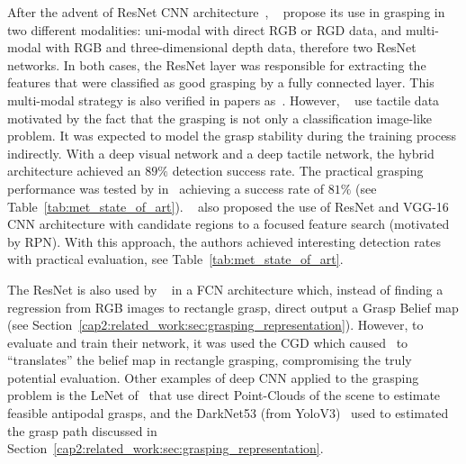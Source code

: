 After the advent of ResNet \ac{CNN} architecture~\cite{he2016deep}, \citeauthor{Kumra2017}~\cite{Kumra2017} propose its use in grasping in two different modalities: uni-modal with direct RGB or RGD data, and multi-modal with RGB and three-dimensional depth data, therefore two ResNet networks. In both cases, the ResNet layer was responsible for extracting the features that were classified as good grasping by a fully connected layer. This multi-modal strategy is also verified in papers as~\cite{Guo2017}. However, \citeauthor{Guo2017}~\cite{Guo2017} use tactile data motivated by the fact that the grasping is not only a classification image-like problem.  It was expected to model the grasp stability during the training process indirectly. With a deep visual network and a deep tactile network, the hybrid architecture achieved an $89\%$ detection success rate. The practical grasping performance was tested by \citeauthor{Chu2018} in~\cite{Chu2018} achieving a success rate of $81\%$ (see Table~\ref{tab:met_state_of_art}). \citeauthor{Chu2018}~\cite{Chu2018} also proposed the use of  ResNet and VGG-16 \ac{CNN} architecture with candidate regions to a focused feature search (motivated by \ac{RPN}). With this approach, the authors achieved interesting detection rates with practical evaluation, see Table~\ref{tab:met_state_of_art}. 

The ResNet is also used by \citeauthor{Ghazaei2019}~\cite{Ghazaei2019} in a \ac{FCN} architecture which, instead of finding a regression from RGB images to rectangle grasp, direct output a Grasp Belief map (see Section~\ref{cap2:related_work:sec:grasping_representation}). However, to evaluate and train their network, it was used the \ac{CGD} which caused~\cite{Ghazaei2019} to ``translates'' the belief map in rectangle grasping, compromising the truly potential evaluation. Other examples of deep \ac{CNN} applied to the grasping problem is the LeNet of~\cite{TenPas2017} that use direct Point-Clouds of the scene to estimate feasible antipodal grasps, and the DarkNet53 (from YoloV3)~\cite{Chen2020} used to estimated the grasp path discussed in Section~\ref{cap2:related_work:sec:grasping_representation}. 

